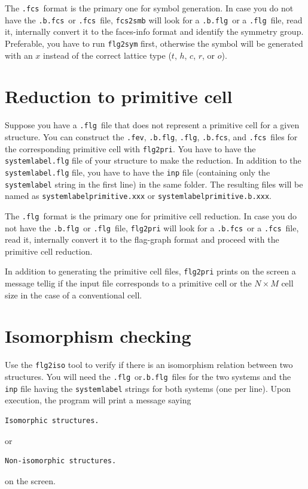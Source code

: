 \documentclass{scrreprt}
\newcommand{\fev}{\texttt{.fev}}
\newcommand{\fcs}{\texttt{.fcs}}
\newcommand{\flg}{\texttt{.flg}}
\newcommand{\fcsb}{\texttt{.b.fcs}}
\newcommand{\flgb}{\texttt{.b.flg}}
\begin{document}
The \fcs~format is the primary one for symbol generation. In case you do not have the \fcsb~or \fcs~file, \verb-fcs2smb- will look for a \flgb~or a \flg~file, read it, internally convert it to the faces-info format and identify the symmetry group. Preferable, you have to run \verb-flg2sym- first, otherwise the symbol will be generated with an $x$ instead of the correct lattice type ($t$, $h$, $c$, $r$, or $o$).

\section{Reduction to primitive cell}

Suppose you have a \flg~file that does not represent a primitive cell for a given structure. You can construct the \fev, \flgb, \flg, \fcsb, and \fcs~files for the corresponding primitive cell with \verb-flg2pri-. You have to have the \verb-systemlabel.flg- file of your structure to make the reduction. In addition to the \verb-systemlabel.flg- file, you have to have the \verb-inp- file (containing only the \verb-systemlabel- string in the first line) in the same folder. The resulting files will be named as \verb-systemlabel-\verb-primitive.xxx- or \verb-systemlabel-\verb-primitive.b.xxx-.

The \flg~format is the primary one for primitive cell reduction. In case you do not have the \flgb~or \flg~file, \verb-flg2pri- will look for a \fcsb~or a \fcs~file, read it, internally convert it to the flag-graph format and proceed with the primitive cell reduction. 

In addition to generating the primitive cell files, \verb-flg2pri- prints on the screen a message tellig if the input file corresponds to a primitive cell or the $N\times M$ cell size in the case of a conventional cell.

\section{Isomorphism checking}

Use the \verb-flg2iso- tool to verify if there is an isomorphism relation between two structures. You will need the \flg~or\flgb~files for the two systems and the \verb-inp- file having the \verb-systemlabel- strings for both systems (one per line). Upon execution, the program will print a message saying
\begin{verbatim}
Isomorphic structures.
\end{verbatim}
or
\begin{verbatim}
Non-isomorphic structures.
\end{verbatim}
on the screen.
\end{document}
